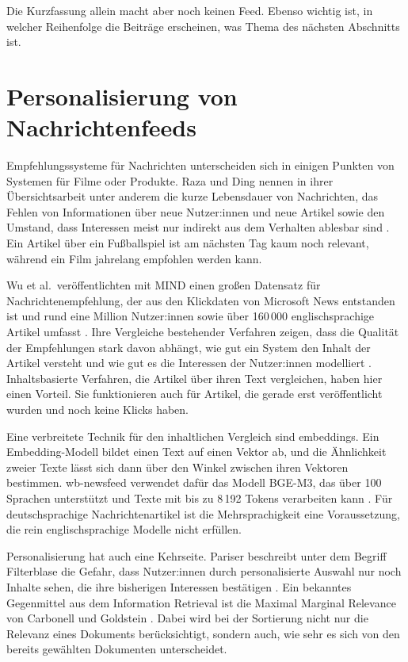 Die Kurzfassung allein macht aber noch keinen Feed.
Ebenso wichtig ist, in welcher Reihenfolge die Beiträge erscheinen, was Thema des nächsten Abschnitts ist.

\section{Personalisierung von Nachrichtenfeeds}\label{sec:related:personalization}
\setauthor{\firstauthor}

Empfehlungssysteme für Nachrichten unterscheiden sich in einigen Punkten von Systemen für Filme oder Produkte.
Raza und Ding nennen in ihrer Übersichtsarbeit unter anderem die kurze Lebensdauer von Nachrichten, das Fehlen von Informationen über neue Nutzer:innen und neue Artikel sowie den Umstand, dass Interessen meist nur indirekt aus dem Verhalten ablesbar sind \cite{raza2022news}.
Ein Artikel über ein Fußballspiel ist am nächsten Tag kaum noch relevant, während ein Film jahrelang empfohlen werden kann.

Wu et al.\ veröffentlichten mit MIND einen großen Datensatz für Nachrichtenempfehlung, der aus den Klickdaten von Microsoft News entstanden ist und rund eine Million Nutzer:innen sowie über 160\,000 englischsprachige Artikel umfasst \cite{wu2020mind}.
Ihre Vergleiche bestehender Verfahren zeigen, dass die Qualität der Empfehlungen stark davon abhängt, wie gut ein System den Inhalt der Artikel versteht und wie gut es die Interessen der Nutzer:innen modelliert \cite{wu2020mind}.
Inhaltsbasierte Verfahren, die Artikel über ihren Text vergleichen, haben hier einen Vorteil.
Sie funktionieren auch für Artikel, die gerade erst veröffentlicht wurden und noch keine Klicks haben.

Eine verbreitete Technik für den inhaltlichen Vergleich sind \glspl{embedding}.
Ein Embedding-Modell bildet einen Text auf einen Vektor ab, und die Ähnlichkeit zweier Texte lässt sich dann über den Winkel zwischen ihren Vektoren bestimmen.
wb-newsfeed verwendet dafür das Modell BGE-M3, das über 100 Sprachen unterstützt und Texte mit bis zu 8\,192 Tokens verarbeiten kann \cite{chen2024bgem3}.
Für deutschsprachige Nachrichtenartikel ist die Mehrsprachigkeit eine Voraussetzung, die rein englischsprachige Modelle nicht erfüllen.

Personalisierung hat auch eine Kehrseite.
Pariser beschreibt unter dem Begriff Filterblase die Gefahr, dass Nutzer:innen durch personalisierte Auswahl nur noch Inhalte sehen, die ihre bisherigen Interessen bestätigen \cite{pariser2011filter}.
Ein bekanntes Gegenmittel aus dem Information Retrieval ist die Maximal Marginal Relevance von Carbonell und Goldstein \cite{carbonell1998mmr}.
Dabei wird bei der Sortierung nicht nur die Relevanz eines Dokuments berücksichtigt, sondern auch, wie sehr es sich von den bereits gewählten Dokumenten unterscheidet.

